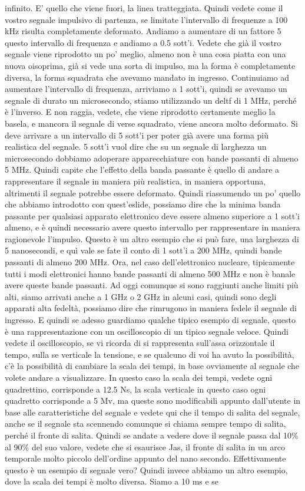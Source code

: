 infinito. E' quello che viene fuori, la linea tratteggiata. Quindi vedete come il vostro segnale impulsivo di partenza, se limitate l'intervallo di frequenze a 100 kHz risulta completamente deformato. Andiamo a aumentare di un fattore 5 questo intervallo di frequenza e andiamo a 0.5 sott'i. Vedete che già il vostro segnale viene riprodotto un po' meglio, almeno non è una cosa piatta con una nuova oisoprima, già si vede una sorta di impulso, ma la forma è completamente diversa, la forma squadrata che avevamo mandato in ingresso. Continuiamo ad aumentare l'intervallo di frequenza, arriviamo a 1 sott'i, quindi se avevamo un segnale di durato un microsecondo, stiamo utilizzando un deltf di 1 MHz, perché è l'inverso. E non raggia, vedete, che viene riprodotto certamente meglio la basela, e mancora il segnale di verse squadrato, viene ancora molto deformato. Si deve arrivare a un intervallo di 5 sott'i per poter già avere una forma più realistica del segnale. 5 sott'i vuol dire che su un segnale di larghezza un microsecondo dobbiamo adoperare apparecchiature con bande passanti di almeno 5 MHz. Quindi capite che l'effetto della banda passante è quello di andare a rappresentare il segnale in maniera più realistica, in maniera opportuna, altrimenti il segnale potrebbe essere deformato. Quindi riassumendo un po' quello che abbiamo introdotto con quest'eslide, possiamo dire che la minima banda passante per qualsiasi apparato elettronico deve essere almeno superiore a 1 sott'i almeno, e è quindi necessario avere questo intervallo per rappresentare in maniera ragionevole l'impulso. Questo è un altro esempio che si può fare, una larghezza di 5 nanosecondi, e quì vale se fate il conto di 1 sott'i a 200 MHz, quindi bande passanti di almeno 200 MHz. Ora, nel caso dell'elettronico nucleare, tipicamente tutti i modi elettronici hanno bande passanti di almeno 500 MHz e non è banale avere queste bande passanti. Ad oggi comunque si sono raggiunti anche limiti più alti, siamo arrivati anche a 1 GHz o 2 GHz in alcuni casi, quindi sono degli apparati alta fedeltà, possiamo dire che rimrugono in maniera fedele il segnale di ingresso. E quindi se adesso guardiamo qualche tipico esempio di segnale, questo è una rappresentazione con un oscilloscopio di un tipico segnale veloce. Quindi vedete il oscilloscopio, se vi ricorda di si rappresenta sull'assa orizzontale il tempo, sulla se verticale la tensione, e se qualcuno di voi ha avuto la possibilità, c'è la possibilità di cambiare la scala dei tempi, in base ovviamente al segnale che volete andare a visualizzare. In questo caso la scala dei tempi, vedete ogni quadrettino, corrisponde a 12.5 Ns, la scala verticale in questo caso ogni quadretto corrisponde a 5 Mv, ma queste sono modificabili appunto dall'utente in base alle caratteristiche del segnale e vedete qui che il tempo di salita del segnale, anche se il segnale sta scennendo comunque si chiama sempre tempo di salita, perché il fronte di salita. Quindi se andate a vedere dove il segnale passa dal 10\% al 90\% del suo valore, vedete che si esaurisce Jas, il fronte di salita in un arco temporale molto piccolo dell'ordine appunto del nano secondo. Effettivamente questo è un esempio di segnale vero? Quindi invece abbiamo un altro esempio, dove la scala dei tempi è molto diversa. Siamo a 10 ms e se 